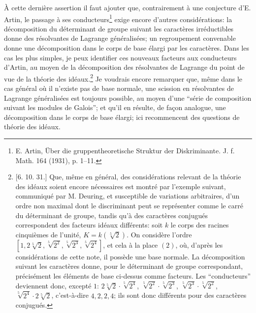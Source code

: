 À cette dernière assertion il faut ajouter que, contrairement à une conjecture d'E. Artin, le passage à ses conducteurs\footnote{E. Artin, Über die gruppentheoretische Struktur der Diskriminante. J. f. Math. 164 (1931), p. 1--11.} exige encore d'autres considérations: la décomposition du déterminant de groupe suivant les caractères irréductibles donne des résolvantes de Lagrange généralisées; un regroupement convenable donne une décomposition dans le corps de base élargi par les caractères. Dans les cas les plus simples, je peux identifier ces nouveaux facteurs aux conducteurs d'Artin, au moyen de la décomposition des résolvantes de Lagrange du point de vue de la théorie des idéaux.\footnote{[6. 10. 31.] Que, même en général, des considérations relevant de la théorie des idéaux soient encore nécessaires est montré par l'exemple suivant, communiqué par M. Deuring, et susceptible de variations arbitraires, d'un ordre non maximal dont le discriminant peut se représenter comme le carré du déterminant de groupe, tandis qu'à des caractères conjugués correspondent des facteurs idéaux différents: soit \(k\) le corps des racines cinquièmes de l'unité, \(K=k(\sqrt[5]{2})\). On considère l'ordre \([1,2\sqrt[5]{2},\sqrt[5]{2^2},\sqrt[5]{2^3},\sqrt[5]{2^4}]\), et cela à la place \((2)\), où, d'après les considérations de cette note, il possède une base normale. La décomposition suivant les caractères donne, pour le déterminant de groupe correspondant, précisément les éléments de base ci-dessus comme facteurs. Les ``conducteurs'' deviennent donc, excepté \(1\): \(2\sqrt[5]{2}\cdot\sqrt[5]{2^4}\), \(\sqrt[5]{2^2}\cdot\sqrt[5]{2^3}\), \(\sqrt[5]{2^3}\cdot\sqrt[5]{2^2}\), \(\sqrt[5]{2^4}\cdot 2\sqrt[5]{2}\), c'est-à-dire \(4,2,2,4\); ils sont donc différents pour des caractères conjugués.} Je voudrais encore remarquer que, même dans le cas général où il n'existe pas de base normale, une scission en résolvantes de Lagrange généralisées est toujours possible, au moyen d'une ``série de composition suivant les modules de Galois''; et qu'il en résulte, de façon analogue, une décomposition dans le corps de base élargi; ici recommencent des questions de théorie des idéaux.

